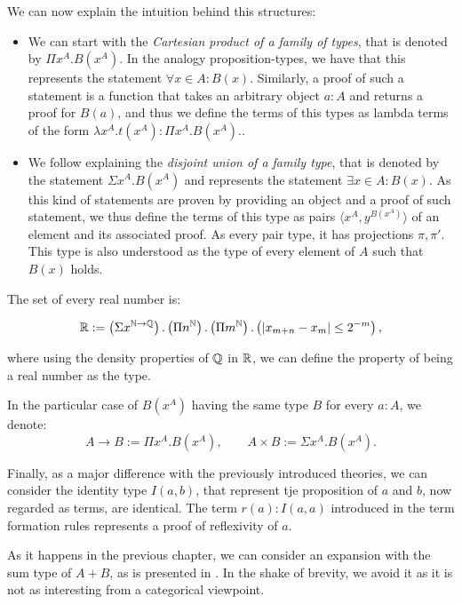 We can now explain the intuition behind this structures:

\begin{itemize}
\item We can start with the \emph{Cartesian product of a family of types}, that is denoted by $\Pi x^A. B(x^A)$. In the analogy proposition-types, we have that this represents the statement $\forall x \in A : B(x)$. Similarly, a proof of such a statement is a function that takes an arbitrary object $a:A$ and returns a proof for $B(a)$, and thus we define the terms of this types as lambda terms of the form $\lambda x^A.t(x^A) : \Pi x^A. B(x^A).$.\\


\item We follow explaining the \emph{disjoint union of a family type}, that is denoted by the statement $\Sigma x^A. B(x^A)$ and represents the statement $\exists x \in A : B(x)$. As this kind of statements are proven by providing an object and a proof of such statement, we thus define the terms of this type as pairs $\langle x^A, y^{B(x^A)}\rangle$ of an element and its associated proof. As every pair type, it has projections $\pi,\pi'$. This type is also understood as the type of every element of $A$ such that $B(x)$ holds.
\end{itemize}
\begin{example}
  The set of every real number is:

  $$\mathbb{R} := \left(\Sigma x^{\mathbb{N}\to\mathbb{Q}}\right).\left(\Pi n^{\mathbb{N}}\right).\left(\Pi m^{\mathbb{N}}\right).\left(|x_{m+n} - x_m| \le 2^{-m}\right),$$
  
  where using the density properties of $\mathbb{Q}$ in $\mathbb{R}$, we can define the property of being a real number as the type.
\end{example}

In the particular case of $B(x^A)$ having the same type $B$ for every $a:A$, we denote:
$$A\to B:= \Pi x^A. B(x^A),\qquad A\times B := \Sigma x^A. B(x^A).$$

Finally, as a major difference with the previously introduced theories, we can consider the identity type $I(a,b)$, that represent tje  proposition of $a$ and $b$, now regarded as terms, are identical. The term $r(a) : I(a,a)$ introduced in the term formation rules represents a proof of reflexivity of $a$. 


\begin{remark}
  As it happens in the previous chapter, we can consider an expansion with the sum type of $A+B$, as is presented in \cite[Section 1.6]{martinlof1973intuitionistic}. In the shake of brevity, we avoid it as it is not as interesting from a categorical viewpoint.
\end{remark}

